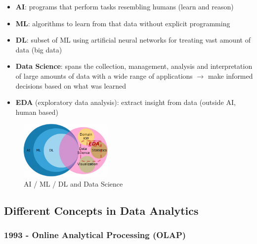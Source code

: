 \documentclass[a4paper]{article}
\begin{document}
		\newpage
		
		\begin{itemize}
			\item \textbf{AI}: programs that perform tasks resembling humans (learn and reason)
			\item \textbf{ML}: algorithms to learn from that data without explicit programming
			\item \textbf{DL}: subset of ML using artificial neural networks for treating vast amount of data (big data)
			\item \textbf{Data Science}: spans the collection, management, analysis and interpretation of large amounts of data with a wide range of applications $\rightarrow$
				make informed decisions based on what was learned
			\item \textbf{EDA} (exploratory data analysis): extract insight from data (outside AI, human based)
		\end{itemize}
	
		\begin{figure}[htb!]
			\centering
			\includegraphics[width=0.4\textwidth]{img/sw01/global_view.png}
			\caption{AI / ML / DL and Data Science}
		\end{figure}
	
		\subsection{Different Concepts in Data Analytics}
		
			\subsubsection{1993 - Online Analytical Processing (OLAP)}
			
\end{document}
